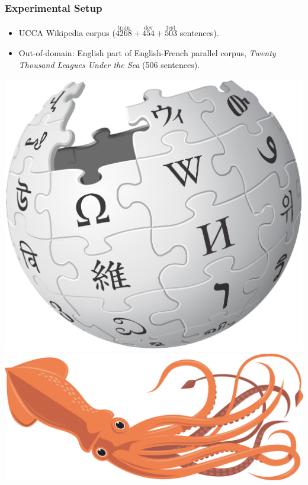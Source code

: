 \documentclass[t]{beamer}
\begin{document}
\begin{frame}
\frametitle{Experimental Setup}
\begin{itemize}
 \item UCCA Wikipedia corpus ($\stackrel{\text{train}}{4268}+\stackrel{\text{dev}}{454}+\stackrel{\text{test}}{503}$ sentences).
 \item Out-of-domain: English part of English-French parallel corpus,
 	\textit{Twenty Thousand Leagues Under the Sea} (506 sentences).
\end{itemize}

\vfill
\begin{center}
  \includegraphics[width=.5\linewidth]{wikipedia.png}
  \includegraphics[width=.5\linewidth]{squid.jpg}
\end{center}
\end{frame}
\end{document}
